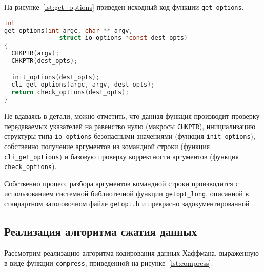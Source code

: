 На рисунке~\ref{lst:get_options} приведен исходный код функции \texttt{get\_options}.

\begin{lstlisting}[basicstyle=\scriptsize\ttfamily,
                   numberstyle=\scriptsize\ttfamily,
                   xleftmargin=7mm,
                   language=C,caption=Функция get\_options,
                   label=lst:get_options]
int
get_options(int argc, char ** argv,
               struct io_options *const dest_opts)
{
  CHKPTR(argv);
  CHKPTR(dest_opts);

  init_options(dest_opts);
  cli_get_options(argc, argv, dest_opts);
  return check_options(dest_opts);
}
\end{lstlisting}

Не вдаваясь в детали, можно отметить, что данная функция производит проверку
передаваемых указателей на равенство нулю (макросы \texttt{CHKPTR}),
инициализацию структуры типа \texttt{io\_options} безопасными значениями
(функция \texttt{init\_options}),
собственно получение аргументов из командной строки
(функция \texttt{cli\_get\_options}) и
базовую проверку корректности аргументов
(функция \texttt{check\_options}).

Собственно процесс разбора аргументов командной строки производится
с использованием системной библиотечной функции \texttt{getopt\_long}, 
описанной в стандартном заголовочном файле \texttt{getopt.h}
и прекрасно задокументированной~\cite{man_getopt_long}.

\subsection{Реализация алгоритма сжатия данных}

Рассмотрим реализацию алгоритма кодирования данных Хаффмана,
выраженную в виде функции \texttt{compress},
приведенной на рисунке~\ref{lst:compress}.

